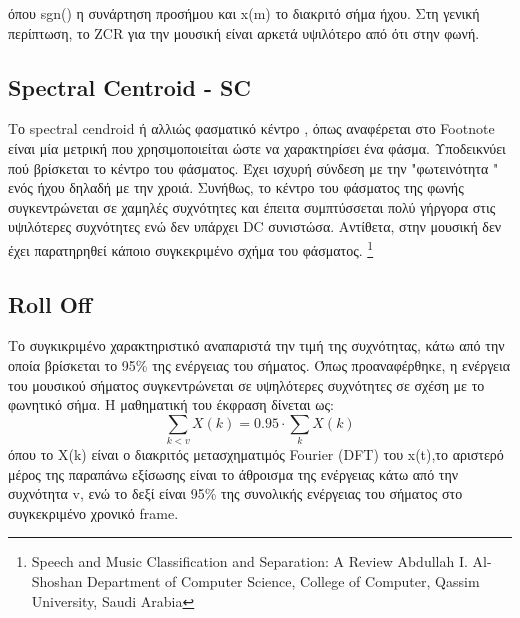 όπου sgn() η συνάρτηση προσήμου και x(m) το διακριτό σήμα ήχου. Στη γενική περίπτωση, το ZCR για την μουσική είναι αρκετά υψιλότερο από ότι στην φωνή.


\subsection{Spectral Centroid - SC}

Το spectral cendroid ή αλλιώς φασματικό κέντρο , όπως αναφέρεται στο Footnote είναι μία μετρική που χρησιμοποιείται ώστε να χαρακτηρίσει ένα φάσμα. Υποδεικνύει πού βρίσκεται το κέντρο του φάσματος. Έχει ισχυρή σύνδεση με την "φωτεινότητα " ενός ήχου δηλαδή με την χροιά. Συνήθως, το κέντρο του φάσματος της φωνής συγκεντρώνεται σε χαμηλές συχνότητες και έπειτα συμπτύσσεται πολύ γήργορα στις υψιλότερες συχνότητες ενώ δεν υπάρχει DC συνιστώσα. Αντίθετα, στην μουσική δεν έχει παρατηρηθεί κάποιο συγκεκριμένο σχήμα του φάσματος. \footnote{
Speech and Music Classification and Separation: A Review 
Abdullah I. Al-Shoshan
Department of Computer Science, College of Computer, 
Qassim University, Saudi Arabia }

 
\subsection{Roll Off}
 
 Το συγκικριμένο χαρακτηριστικό αναπαριστά την τιμή της συχνότητας, κάτω από την οποία βρίσκεται το 95\% της ενέργειας του σήματος. Όπως προαναφέρθηκε, η ενέργεια του μουσικού σήματος συγκεντρώνεται σε υψηλότερες συχνότητες σε σχέση με το φωνητικό σήμα. Η μαθηματική του έκφραση δίνεται ως:
 \begin{equation}
 \sum_{k<v} X(k) = 0.95 \cdot \sum_{k}X(k)
 \end{equation}
 όπου το X(k) είναι ο διακριτός μετασχηματιμός Fourier (DFT) του x(t),το αριστερό μέρος της παραπάνω εξίσωσης είναι το άθροισμα της ενέργειας κάτω από την συχνότητα v, ενώ το δεξί είναι 95\% της συνολικής ενέργειας του σήματος στο συγκεκριμένο χρονικό frame.

